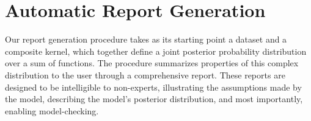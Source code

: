 \documentclass{article} %
\begin{document}
\section{Automatic Report Generation}
\label{sec:method}
\vspace{-0.1in}

Our report generation procedure takes as its starting point a dataset and a composite kernel, which together define a joint posterior probability distribution over a sum of functions.
The procedure summarizes properties of this complex distribution to the user through a comprehensive report.
%
These reports are designed to be intelligible to non-experts, illustrating the assumptions made by the model, describing the model's posterior distribution, and most importantly, enabling model-checking.
%
%
%
%
%
\end{document}
